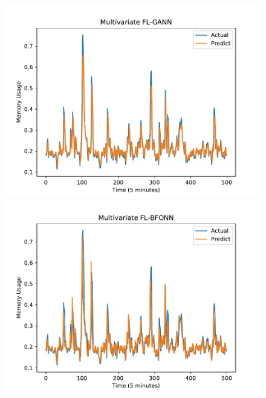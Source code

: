\documentclass[runningheads]{llncs}
\begin{document}
\begin{figure}[!h]
	\centering
	\begin{minipage}[t]{4cm}
		\centering
		\includegraphics[width=1\textwidth =0cm 0cm 0cm 0cm]{images/pdf/multi_ram_flgann.pdf}
	\end{minipage}
	\begin{minipage}[t]{4cm}
		\centering
		\includegraphics[width=1\textwidth =0cm 0cm 0cm 0cm]{images/pdf/multi_ram_flbfonn.pdf}
	\end{minipage}
	\begin{minipage}[t]{4cm}
		\centering

\end{minipage}
\end{figure}
\end{document}
